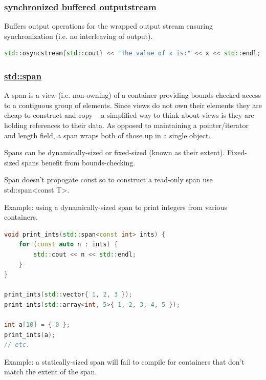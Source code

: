 \subsubsection{\href{https://github.com/AnthonyCalandra/modern-cpp-features/tree/master\#synchronized-buffered-outputstream}
                    {synchronized buffered outputstream}}
Buffers output operations for the wrapped output stream ensuring synchronization (i.e. no interleaving of output).

\begin{lstlisting}[language=C++]
std::osyncstream{std::cout} << "The value of x is:" << x << std::endl;
\end{lstlisting}


\subsubsection{\href{https://github.com/AnthonyCalandra/modern-cpp-features/tree/master\#stdspan}
                    {std::span}}
A span is a view (i.e. non-owning) of a container providing bounds-checked access to a contiguous group of elements. Since views do not own their elements they are cheap to construct and copy -- a simplified way to think about views is they are holding references to their data. As opposed to maintaining a pointer/iterator and length field, a span wraps both of those up in a single object.

Spans can be dynamically-sized or fixed-sized (known as their extent). Fixed-sized spans benefit from bounds-checking.

Span doesn't propogate const so to construct a read-only span use std::span<const T>.

Example: using a dynamically-sized span to print integers from various containers.

\begin{lstlisting}[language=C++]
void print_ints(std::span<const int> ints) {
    for (const auto n : ints) {
        std::cout << n << std::endl;
    }
}

print_ints(std::vector{ 1, 2, 3 });
print_ints(std::array<int, 5>{ 1, 2, 3, 4, 5 });

int a[10] = { 0 };
print_ints(a);
// etc.
\end{lstlisting}

Example: a statically-sized span will fail to compile for containers that don't match the extent of the span.

